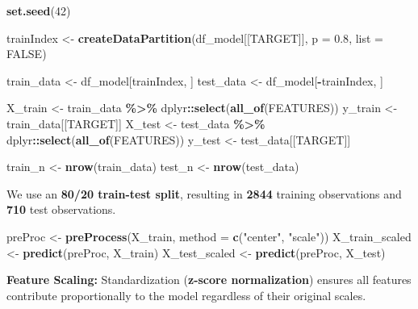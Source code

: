 \documentclass[
]{article}
\newenvironment{Shaded}{\begin{snugshade}}{\end{snugshade}}
\newcommand{\AttributeTok}[1]{\textcolor[rgb]{0.13,0.29,0.53}{#1}}
\newcommand{\ConstantTok}[1]{\textcolor[rgb]{0.56,0.35,0.01}{#1}}
\newcommand{\DecValTok}[1]{\textcolor[rgb]{0.00,0.00,0.81}{#1}}
\newcommand{\FloatTok}[1]{\textcolor[rgb]{0.00,0.00,0.81}{#1}}
\newcommand{\FunctionTok}[1]{\textcolor[rgb]{0.13,0.29,0.53}{\textbf{#1}}}
\newcommand{\NormalTok}[1]{#1}
\newcommand{\OtherTok}[1]{\textcolor[rgb]{0.56,0.35,0.01}{#1}}
\newcommand{\SpecialCharTok}[1]{\textcolor[rgb]{0.81,0.36,0.00}{\textbf{#1}}}
\newcommand{\StringTok}[1]{\textcolor[rgb]{0.31,0.60,0.02}{#1}}
\begin{document}
\begin{Shaded}
\begin{Highlighting}[]
\FunctionTok{set.seed}\NormalTok{(}\DecValTok{42}\NormalTok{)}

\NormalTok{trainIndex }\OtherTok{\textless{}{-}} \FunctionTok{createDataPartition}\NormalTok{(df\_model[[TARGET]], }\AttributeTok{p =} \FloatTok{0.8}\NormalTok{, }\AttributeTok{list =} \ConstantTok{FALSE}\NormalTok{)}

\NormalTok{train\_data }\OtherTok{\textless{}{-}}\NormalTok{ df\_model[trainIndex, ]}
\NormalTok{test\_data }\OtherTok{\textless{}{-}}\NormalTok{ df\_model[}\SpecialCharTok{{-}}\NormalTok{trainIndex, ]}

\NormalTok{X\_train }\OtherTok{\textless{}{-}}\NormalTok{ train\_data }\SpecialCharTok{\%\textgreater{}\%}\NormalTok{ dplyr}\SpecialCharTok{::}\FunctionTok{select}\NormalTok{(}\FunctionTok{all\_of}\NormalTok{(FEATURES))}
\NormalTok{y\_train }\OtherTok{\textless{}{-}}\NormalTok{ train\_data[[TARGET]]}
\NormalTok{X\_test }\OtherTok{\textless{}{-}}\NormalTok{ test\_data }\SpecialCharTok{\%\textgreater{}\%}\NormalTok{ dplyr}\SpecialCharTok{::}\FunctionTok{select}\NormalTok{(}\FunctionTok{all\_of}\NormalTok{(FEATURES))}
\NormalTok{y\_test }\OtherTok{\textless{}{-}}\NormalTok{ test\_data[[TARGET]]}

\NormalTok{train\_n }\OtherTok{\textless{}{-}} \FunctionTok{nrow}\NormalTok{(train\_data)}
\NormalTok{test\_n }\OtherTok{\textless{}{-}} \FunctionTok{nrow}\NormalTok{(test\_data)}
\end{Highlighting}
\end{Shaded}

We use an \textbf{80/20 train-test split}, resulting in \textbf{2844}
training observations and \textbf{710} test observations.

\begin{Shaded}
\begin{Highlighting}[]
\NormalTok{preProc }\OtherTok{\textless{}{-}} \FunctionTok{preProcess}\NormalTok{(X\_train, }\AttributeTok{method =} \FunctionTok{c}\NormalTok{(}\StringTok{"center"}\NormalTok{, }\StringTok{"scale"}\NormalTok{))}
\NormalTok{X\_train\_scaled }\OtherTok{\textless{}{-}} \FunctionTok{predict}\NormalTok{(preProc, X\_train)}
\NormalTok{X\_test\_scaled }\OtherTok{\textless{}{-}} \FunctionTok{predict}\NormalTok{(preProc, X\_test)}
\end{Highlighting}
\end{Shaded}

\textbf{Feature Scaling:} Standardization (\textbf{z-score
normalization}) ensures all features contribute proportionally to the
model regardless of their original scales.
\end{document}
